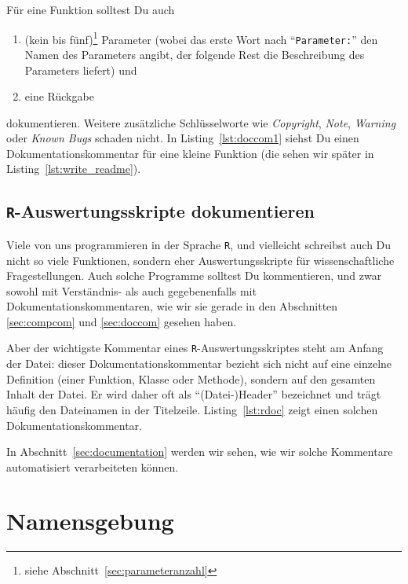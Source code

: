 \documentclass[twoside]{scrreprt}
\providecommand{\R}{\texttt{R}}
\providecommand{\code}[1]{\texttt{#1}}
\begin{document}
F\"u{}r eine Funktion solltest Du auch
\begin{enumerate}[resume]
    \item (kein bis f\"u{}nf)\footnote{siehe
	    Abschnitt~\ref{sec:parameteranzahl}} Parameter (wobei das erste Wort
	    nach "`\code{Parameter:}"' den Namen des Parameters angibt, der
	    folgende Rest die Beschreibung des Parameters liefert) und
    \item eine R\"u{}ckgabe
\end{enumerate}
dokumentieren. Weitere zus\"a{}tzliche Schl\"u{}sselworte wie
\emph{Copyright}, \emph{Note}, \emph{Warning} oder \emph{Known Bugs}
schaden nicht.
In Listing~\ref{lst:doccom1} siehst Du einen Dokumentationskommentar
f\"u{}r eine kleine Funktion (die sehen wir sp\"a{}ter in
Listing~\ref{lst:write_readme}).


\subsection{\R{}-Auswertungsskripte dokumentieren
\label{sec:rdoc}
}
Viele von uns programmieren in der Sprache \R{}, und vielleicht schreibst
auch Du nicht so viele Funktionen, sondern eher Auswertungsskripte f\"u{}r
wissenschaftliche Fragestellungen.
Auch solche Programme solltest Du kommentieren, und zwar sowohl mit
Verst\"a{}ndnis- als auch gegebenenfalls mit  Dokumentationskommentaren, wie wir
sie gerade in den Abschnitten \ref{sec:compcom} und \ref{sec:doccom} gesehen
haben.

Aber der wichtigste Kommentar eines \R{}-Auswertungsskriptes steht 
am Anfang der Datei: dieser Dokumentationskommentar bezieht sich nicht auf eine
einzelne Definition (einer Funktion, Klasse oder Methode), sondern auf den
gesamten Inhalt der
Datei. Er wird daher oft als "`(Datei-)Header"' bezeichnet und tr\"a{}gt
h\"a{}ufig den Dateinamen in der Titelzeile.
Listing~\ref{lst:rdoc} zeigt einen solchen Dokumentationskommentar.


In Abschnitt~\ref{sec:documentation} werden wir sehen, wie wir solche
Kommentare automatisiert verarbeiteten k\"o{}nnen.


\section{Namensgebung\label{sec:naming}}
\end{document}
